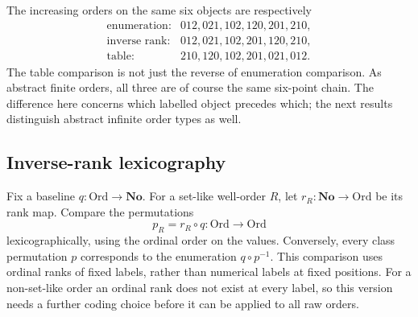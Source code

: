 \documentclass[11pt]{article}
\theoremstyle{definition}
\theoremstyle{remark}
\newcommand{\No}{\mathbf{No}}
\newcommand{\Ord}{\mathrm{Ord}}
\begin{document}
The increasing orders on the same six objects are respectively
\[
\begin{array}{ll}
\text{enumeration:}&012,021,102,120,201,210,\\
\text{inverse rank:}&012,021,102,201,120,210,\\
\text{table:}&210,120,102,201,021,012.
\end{array}
\]
The table comparison is not just the reverse of enumeration comparison.
As abstract finite orders, all three are of course the same six-point
chain. The difference here concerns which labelled object precedes which;
the next results distinguish abstract infinite order types as well.

\subsection{Inverse-rank lexicography}

Fix a baseline $q:\Ord\to\No$. For a set-like well-order $R$, let
$r_R:\No\to\Ord$ be its rank map. Compare the permutations
\[
 p_R=r_R\circ q:\Ord\longrightarrow\Ord
\]
lexicographically, using the ordinal order on the values. Conversely,
every class permutation $p$ corresponds to the enumeration $q\circ p^{-1}$.
This comparison uses ordinal ranks of fixed labels, rather than numerical
labels at fixed positions. For a non-set-like order an ordinal rank does
not exist at every label, so this version needs a further coding choice
before it can be applied to all raw orders.
\end{document}
